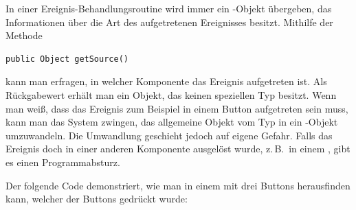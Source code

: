 In einer Ereignis-Behandlungsroutine wird immer ein -Objekt
übergeben, das Informationen über die Art des aufgetretenen Ereignisses
besitzt. Mithilfe der Methode

\begin{lstlisting}
public Object getSource()
\end{lstlisting}

kann man erfragen, in welcher Komponente das Ereignis aufgetreten ist. Als
Rückgabewert erhält man ein Objekt, das keinen speziellen Typ besitzt. Wenn
man weiß, dass das Ereignis zum Beispiel in einem Button aufgetreten sein muss,
kann man das System zwingen, das allgemeine Objekt vom Typ  in
ein -Objekt umzuwandeln. Die Umwandlung geschieht jedoch \glqq auf
eigene Gefahr\grqq . Falls das Ereignis doch in einer anderen Komponente ausgelöst
wurde, z.\,B.\ in einem , gibt es einen Programmabsturz.

Der folgende Code demonstriert, wie man in einem  mit drei
Buttons herausfinden kann, welcher der Buttons gedrückt wurde:

